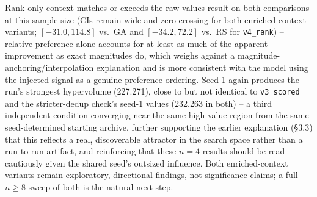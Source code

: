 \documentclass{article}
\begin{document}
Rank-only context matches or exceeds the raw-values result on both comparisons at this sample size (CIs remain wide and zero-crossing for both enriched-context variants; $[-31.0,114.8]$ vs.\ GA and $[-34.2,72.2]$ vs.\ RS for \texttt{v4\_rank}) -- relative preference alone accounts for at least as much of the apparent improvement as exact magnitudes do, which weighs against a magnitude-anchoring/interpolation explanation and is more consistent with the model using the injected signal as a genuine preference ordering. Seed 1 again produces the run's strongest hypervolume (227.271), close to but not identical to \texttt{v3\_scored} and the stricter-dedup check's seed-1 values (232.263 in both) -- a third independent condition converging near the same high-value region from the same seed-determined starting archive, further supporting the earlier explanation (\S3.3) that this reflects a real, discoverable attractor in the search space rather than a run-to-run artifact, and reinforcing that these $n=4$ results should be read cautiously given the shared seed's outsized influence. Both enriched-context variants remain exploratory, directional findings, not significance claims; a full $n\ge8$ sweep of both is the natural next step.
\end{document}
